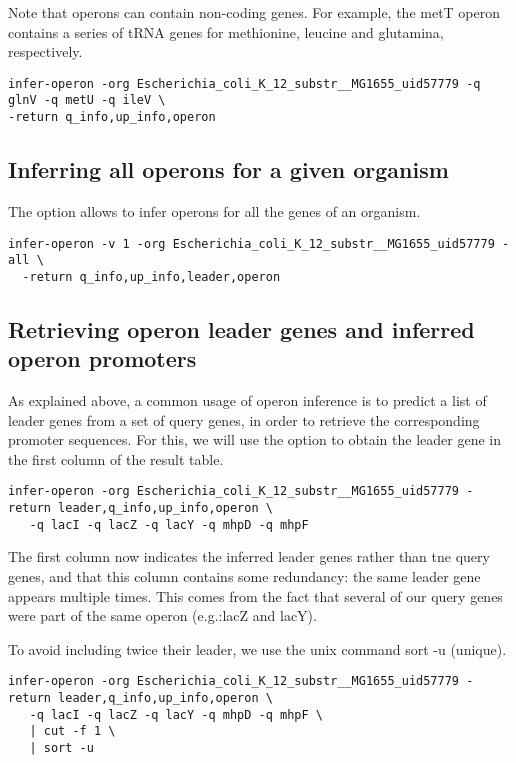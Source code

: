 Note that operons can contain non-coding genes. For example, the
metT operon contains a series of tRNA genes for methionine, leucine
and glutamina, respectively.

\begin{lstlisting}
infer-operon -org Escherichia_coli_K_12_substr__MG1655_uid57779 -q glnV -q metU -q ileV \
-return q_info,up_info,operon
\end{lstlisting}

\subsection{Inferring all operons for a given organism}

The option  allows to infer operons for all the genes of
an organism.

\begin{lstlisting}
infer-operon -v 1 -org Escherichia_coli_K_12_substr__MG1655_uid57779 -all \
  -return q_info,up_info,leader,operon
\end{lstlisting}

\subsection{Retrieving operon leader genes and inferred
  operon promoters}

As explained above, a common usage of operon inference is to predict a
list of leader genes from a set of query genes, in order to retrieve
the corresponding promoter sequences. For this, we will use the option
\option{-return} to obtain the leader gene in the first column of the
result table. 

\begin{lstlisting}
infer-operon -org Escherichia_coli_K_12_substr__MG1655_uid57779 -return leader,q_info,up_info,operon \
   -q lacI -q lacZ -q lacY -q mhpD -q mhpF
\end{lstlisting}

The first column now indicates the inferred leader genes rather than
tne query genes, and that this column contains some redundancy: the
same leader gene appears multiple times. This comes from the fact that
several of our query genes were part of the same operon (e.g.:lacZ and
lacY).

To avoid including twice their leader, we use the unix command sort -u
(unique).


\begin{lstlisting}
infer-operon -org Escherichia_coli_K_12_substr__MG1655_uid57779 -return leader,q_info,up_info,operon \
   -q lacI -q lacZ -q lacY -q mhpD -q mhpF \
   | cut -f 1 \
   | sort -u 
\end{lstlisting}

